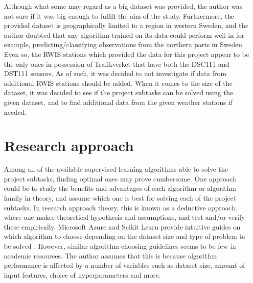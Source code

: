 	 Although what some may regard as a big dataset was provided, the author was not sure if it was big enough to fulfill the aim of the study. Furthermore, the provided dataset is geographically limited to a region in western Sweden, and the author doubted that any algorithm trained on its data could perform well in for example, predicting/classifying observations from the northern parts in Sweden. Even so, the RWIS stations which provided the data for this project appear to be the only ones in possession of Trafikverket that have both the DSC111 and DST111 sensors. As of such, it was decided to not investigate if data from additional RWIS stations should be added. When it comes to the size of the dataset, it was decided to see if the project subtasks can be solved using the given dataset, and to find additional data from the given weather stations if needed.



\section{Research approach}
		Among all of the available supervised learning algorithms able to solve the project subtasks, finding optimal ones may prove cumbersome. One approach could be to study the benefits and advantages of each algorithm or algorithm family in theory, and assume which one is best for solving each of the project subtasks. In research approach theory, this is known as a deductive approach; where one makes theoretical hypothesis and assumptions, and test and/or verify these empirically. Microsoft Azure and Scikit Learn provide intuitive guides on which algorithm to choose depending on the dataset size and type of problem to be solved \cite{WEBSITE:20, WEBSITE:21}. However, similar algorithm-choosing guidelines seems to be few in academic resources. The author assumes that this is because algorithm performance is affected by a number of variables such as dataset size, amount of input features, choice of hyperparameters and more. 

